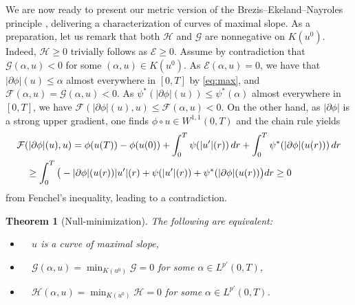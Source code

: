 \documentclass[10pt,a4paper]{amsart}
\newcommand{\dr}{{\rm d} r}
\renewcommand{\sl}{|\partial \phi|}
\newcommand{\GG}{{\mathcal G}}
\newcommand{\EE}{{\mathcal E}}
\newcommand{\FF}{{\mathcal F}}
\newcommand{\HH}{{\mathcal H}}
\newtheorem{theorem}{Theorem}[section]
\begin{document}
We are now ready to present  our metric version of the Brezis--Ekeland--Nayroles principle \cite{Brezis-Ekeland76b,Brezis-Ekeland76,Nayroles76,Nayroles76b}, delivering a
characterization of
curves of maximal slope. 
As a preparation, let us remark that  both $\HH $ and
 $\GG$  are  nonnegative on
$K(u^0)$.  Indeed, $\HH \geq 0$ trivially follows as $\EE
\geq 0$. Assume  by contradiction that $\GG(\alpha, u)<0$ for some
$(\alpha , u) \in K(u^0)$. As $ \EE ( \alpha,u)=0$, we have  
  that $\sl( u) \leq \alpha $ almost everywhere in $[0,T]$  by \eqref{eq:max}, and
$\FF(\alpha,u)=\GG(\alpha,u)<0$.  As $\psi^*(\sl( u))\leq \psi^*(\alpha)$ almost everywhere in
 $[0,T]$, we have $\FF(\sl( u),  u)\leq \FF(\alpha,  u)<0$. On the other
 hand, as $\sl$ is a strong upper gradient, one finds 
 $\phi\circ u\in W^{1,1}(0,T)$ and the chain rule yields
 \begin{align*}
   &\FF(\sl( u) , u) = \phi( u(T))-\phi(u(0))+ \int_0^T \psi(| u'|(r))\,
   \dr + \int_0^T \psi^*(\sl( u(r)))\, \dr \\
   &\quad \geq \int_0^T \big( - \sl( u(r)) | u'|(r)
                       +\psi(| u'|(r))+\psi^*( \sl( u(r))\big)
                       \dr \geq 0
 \end{align*}
 from Fenchel's inequality, leading to a contradiction.

 


 \begin{theorem}[Null-minimization]\label{prop:BEN}
    The following are equivalent:
   \begin{itemize}
   \item[\rm (i)] \ \  $u$ is a curve of maximal slope,\vspace{0.6mm}
     \item[\rm (ii)] \  \ $
  \GG(\alpha,u)=\min_{K(u^0)} \GG=0$ for some $\alpha \in
  L^{p'}(0,T)$,
  \item[\rm (iii)]  \ \   $
  \HH(\alpha,u)=\min_{K(u^0)} \HH=0$ for some $\alpha \in
  L^{p'}(0,T)$.
   \end{itemize}  
\end{theorem}
\end{document}
